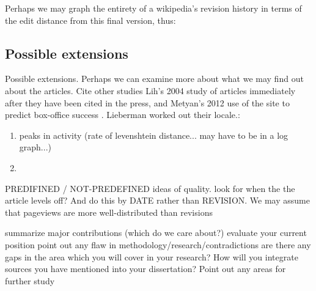 \documentclass[a4paper,11pt,twoside,notitlepage]{article}
\begin{document}
        Perhaps we may graph the entirety of a wikipedia's revision
        history in terms of the edit distance from this final version,
        thus:

        \begin{figure}[h!]
          \centering
          \pgfplotsset{width=0.5\textwidth}
          \label{fig:dummy_history}
        \end{figure}
        

        \subsection*{Possible extensions}
        Possible extensions.  Perhaps we can examine more about what
        we may find out about the articles. Cite other studies Lih's
        2004 study of articles immediately after they have been cited
        in the press\cite{Lih2004}, and Metyan's 2012 use of the site
        to predict box-office success \cite{Mestyan2012}. Lieberman
        worked out their locale.\cite{Lieberman2009}:

        \begin{enumerate}
          \item peaks in activity (rate of levenshtein distance... may
            have to be in a log graph...)
          \item 
        \end{enumerate}

        PREDIFINED / NOT-PREDEFINED ideas of quality. look for when
        the the article levels off? And do this by DATE rather than
        REVISION. We may assume that pageviews are more
        well-distributed than revisions

        summarize major contributions (which do we care about?)
        evaluate your current position point out any flaw in
        methodology/research/contradictions are there any gaps in the
        area which you will cover in your research?  How will you
        integrate sources you have mentioned into your dissertation?
        Point out any areas for further study
\end{document}
